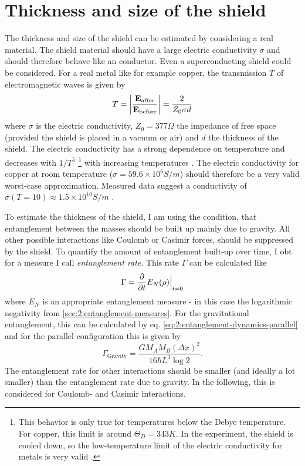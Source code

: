 \section{Thickness and size of the shield}
The thickness and size of the shield can be estimated by considering a real material. The shield material should have a large electric conductivity $\sigma$ and should therefore behave like an conductor. Even a superconducting shield could be considered.
For a real metal like for example copper, the transmission $T$ of electromagnetic waves is given by \cite{Vandenbosch_2022}
\begin{equation}
  T = \abs{\frac{\vec{E}_\mathrm{after}}{\vec{E}_\mathrm{before}}} = \frac{2}{Z_0 \sigma d}
\end{equation}
where $\sigma$ is the electric conductivity, $Z_0 = 377\si{\Omega}$ the impedance of free space (provided the shield is placed in a vacuum or air) and $d$ the thickness of the shield.
The electric conductivity has a strong dependence on temperature and decreases with $1/T^5$ \footnote{This behavior is only true for temperatures below the Debye temperature. For copper, this limit is around $\Theta_D = 343\si{K}$. In the experiment, the shield is cooled down, so the low-temperature limit of the electric conductivity for metals is very valid \cite{Berman_1952}.} with increasing temperatures \cite[p. 284-286]{Gross_2018}. The electric conductivity for copper at room temperature ($\sigma = 59.6\times 10^6 \si{S/m}$) should therefore be a very valid worst-case approximation. 
Measured data suggest a conductivity of $\sigma(T = 10) \approx 1.5\times 10^{10}\si{S/m}$ \cite{Berman_1952}.

To estimate the thickness of the shield, I am using the condition, that entanglement between the masses should be built up mainly due to gravity. All other possible interactions like Coulomb or Casimir forces, should be suppressed by the shield.
To quantify the amount of entanglement built-up over time, I obt for a measure I call \emph{entanglement rate}.
This rate $\Gamma$ can be calculated like
\begin{equation}\label{eq:4:entanglement-rate}
  \Gamma = \pdv{t} E_N(\rho)\Big|_{t=0}
\end{equation} 
where $E_N$ is an appropriate entanglement measure - in this case the logarithmic negativity from \cref{sec:2:entanglement-measures}.
For the gravitational entanglement, this can be calculated by eq. \eqref{eq:2:entanglement-dynamics-parallel} and for the parallel configuration this is given by
\begin{equation}\label{eq:4:entanglement-rate-gravity}
  \Gamma_\mathrm{Gravity} = \frac{G M_A M_B (\Delta x)^2}{16 \hbar L^3 \log 2} .
\end{equation}
The entanglement rate for other interactions should be smaller (and ideally a lot smaller) than the entanglement rate due to gravity.
In the following, this is considered for Coulomb- and Casimir interactions.

